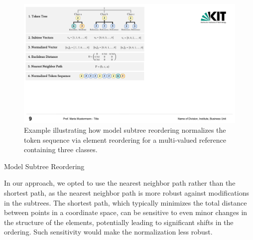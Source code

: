 \begin{figure}
    \centering
    \includegraphics[width=0.9\linewidth]{figures/mde/normalization-new.pdf}
    \caption[Model Subtree Reordering Example]{Example illustrating how model subtree reordering normalizes the token sequence via element reordering for a multi-valued reference containing three classes.}
    \label{fig:tokentreenorm}
\end{figure}

\begin{algorithm}
	\caption{Model Subtree Reordering}
	\label{alg:NormalizationAlgorithm}
	\begin{algorithmic}
		\EndFor
  
		\EndFor
  
		\EndFunction
	\end{algorithmic}
\end{algorithm}

%

\noindent

In our approach, we opted to use the nearest neighbor path rather than the shortest path, as the nearest neighbor path is more robust against modifications in the subtrees. The shortest path, which typically minimizes the total distance between points in a coordinate space, can be sensitive to even minor changes in the structure of the elements, potentially leading to significant shifts in the ordering. Such sensitivity would make the normalization less robust.

